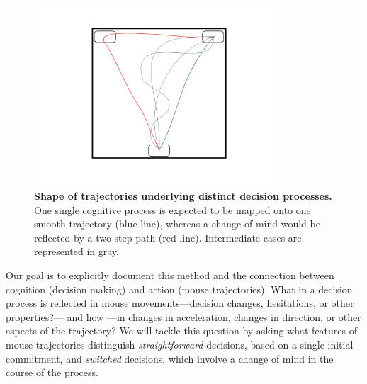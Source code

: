 \documentclass[11pt]{article}
\begin{document}
\begin{figure}[h]
\centering
\includegraphics[width=0.8\textwidth]{trajectories.jpeg}
\caption{\textbf{Shape of trajectories underlying distinct decision processes.} One single cognitive process is expected to be mapped onto one smooth trajectory (blue line), whereas a change of mind would be reflected by a two-step path (red line). Intermediate cases are represented in gray.} \label{fig:scheme.traj}
\end{figure}

Our goal is to explicitly document this method and the connection between cognition (decision making) and action (mouse trajectories): What in a decision process is reflected in mouse movements---decision changes, hesitations, or other properties?--- and how ---in changes in acceleration, changes in direction, or other aspects of the trajectory? %
We will tackle this question by asking what features of mouse trajectories distinguish \emph{straightforward} decisions, based on a single initial commitment, and \emph{switched} decisions, which involve a change of mind in the course of the process.%
 
\end{document}
